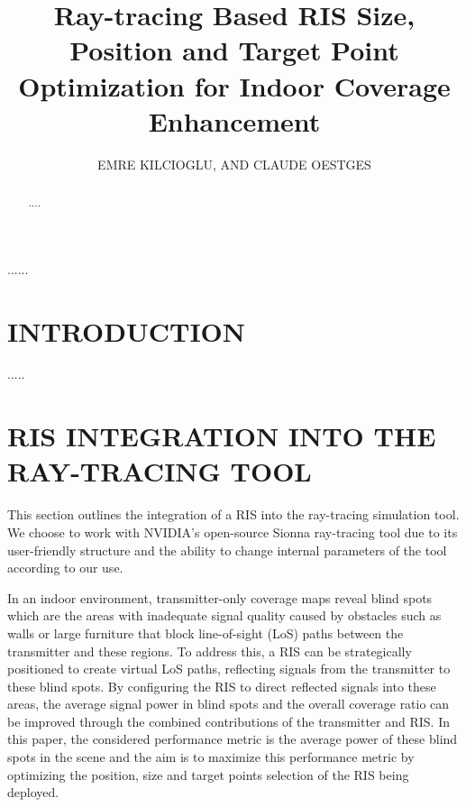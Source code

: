 \documentclass{IEEEoj}
\begin{document}

\title{Ray-tracing Based RIS Size, Position and Target Point Optimization for Indoor Coverage Enhancement}

\author{EMRE KILCIOGLU, AND CLAUDE OESTGES}

\begin{abstract}
....
\end{abstract}

\begin{IEEEkeywords}
......
\end{IEEEkeywords}


\maketitle

\section{INTRODUCTION}
 .....

\section{RIS INTEGRATION INTO THE RAY-TRACING TOOL}
This section outlines the integration of a RIS into the ray-tracing simulation tool. We choose to work with NVIDIA's open-source Sionna ray-tracing tool \cite{sionna} due to its user-friendly structure and the ability to change internal parameters of the tool according to our use.

In an indoor environment, transmitter-only coverage maps reveal blind spots which are the areas with inadequate signal quality caused by obstacles such as walls or large furniture that block line-of-sight (LoS) paths between the transmitter and these regions. To address this, a RIS can be strategically positioned to create virtual LoS paths, reflecting signals from the transmitter to these blind spots. By configuring the RIS to direct reflected signals into these areas, the average signal power in blind spots and the overall coverage ratio can be improved through the combined contributions of the transmitter and RIS. In this paper, the considered performance metric is the average power of these blind spots in the scene and the aim is to maximize this performance metric by optimizing the position, size and target points selection of the RIS being deployed.
\end{document}
